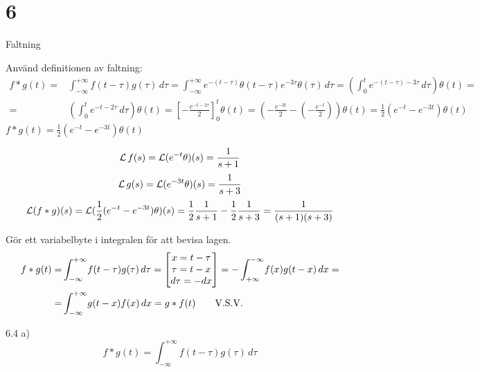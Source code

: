 \chapter{6}{Faltning}

\begin{task}{6.1}
	Använd definitionen av faltning:
	\begin{align*}
	f*g(t)=
	&\int_{-\infty}^{+\infty}\! f(t-\tau)g(\tau)\, d\tau=
	\int_{-\infty}^{+\infty}\! e^{-(t-\tau)}\theta(t-\tau)e^{-3\tau}\theta(\tau)\, d\tau=
	\left(\int_{0}^{t}\! e^{-(t-\tau)-3\tau}\, d\tau\right)\theta(t)= \\ =
	&\left(\int_{0}^{t}\! e^{-t-2\tau}\, d\tau\right)\theta(t)=
	\left[-\frac{e^{-t-2\tau}}{2}\right]_0^t\theta(t)=
	\left(-\frac{e^{-3t}}{2}-\left(-\frac{e^{-t}}{2}\right)\right)\theta(t)=
	\frac{1}{2}(e^{-t}-e^{-3t})\theta(t)
	\end{align*}
	\ans $f*g(t)=\frac{1}{2}(e^{-t}-e^{-3t})\theta(t)$
\end{task}

\begin{task}{6.2}
	\begin{align*}
	\operatorname{\mathcal{L}} f(s)=
	\operatorname{\mathcal{L}} (e^{-t}\theta)(s)=
	\frac{1}{s+1}
	\end{align*}
	\begin{align*}
	\operatorname{\mathcal{L}} g(s)=
	\operatorname{\mathcal{L}} (e^{-3t}\theta)(s)=
	\frac{1}{s+3}
	\end{align*}
	\begin{align*}
	\laplace (f*g)(s)=
	\laplace (\frac{1}{2}(e^{-t}-e^{-3t})\theta)(s)=
	\frac{1}{2}\*\frac{1}{s+1}-\frac{1}{2}\*\frac{1}{s+3}=
	\frac{1}{(s+1)(s+3)}
	\end{align*}
\end{task}

\begin{task}{6.3}
	Gör ett variabelbyte i integralen för att bevisa lagen.
	\begin{align*}
	f*g(t)=
	&\int_{-\infty}^{+\infty}\!f(t-\tau)g(\tau)\, d\tau=
	\begin{bmatrix}
	x=t-\tau \\
	\tau=t-x \\
	d\tau=-dx
	\end{bmatrix}=
	-\int_{+\infty}^{-\infty}\!f(x)g(t-x)\, dx= \\ =
	&\int_{-\infty}^{+\infty}\!g(t-x)f(x)\, dx=
	g*f(t)\text{\qquad V.S.V.}
	\end{align*}
\end{task}

\begin{task}{6.4 a)}
	\[f*g(t)=\int_{-\infty}^{+\infty}\!f(t-\tau)g(\tau)\, d\tau\]
\end{task}